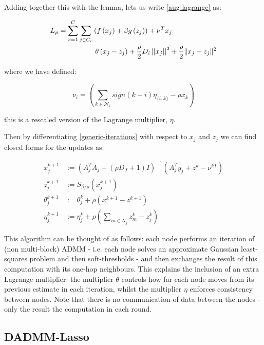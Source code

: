 Adding together this with the lemma, lets us write \eqref{aug-lagrange} as:

\begin{align}
L_\rho = \sum_{c=1}^C\sum_{j \in C_c} &\left( f\left(x_j\right) + \beta g\left(z_j\right)\right) + \nu^Tx_j \nonumber \\
& \text{        } \theta\left(x_j - z_j\right) + \frac{\rho}{2}D_i\left|\left|x_j\right|\right|^2 + \frac{\rho }{2}\|x_j-z_j\|^2
\label{generic-iterations}
\end{align}

where we have defined:

\begin{equation}
\nu_i = \left(\sum_{k \in \mathcal{N}_i} sign\left(k-i\right)\eta_{\{i,k\}} - \rho x_k \right)
\end{equation}

this is a rescaled version of the Lagrange multiplier, \(\eta\). 

Then by differentiating \eqref{generic-iterations} with respect to \(x_j\) and \(z_j\) we  can find closed forms for the updates as:

\begin{thm}
\begin{align}
x_j^{k+1} &:= \left(A_j^TA_j + (\rho D_J + 1) I\right)^{-1}\left(A_j^Ty_j +  z^k - \nu^{kT}\right)\\
z_j^{k+1} &:= S_{\beta/\rho}\left(x_j^{k+1} \right)
 \\
\theta_j^{k+1} &:= \theta_j^{k} + \rho \left(x^{k+1}-z^{k+1}\right) \\
\eta_j^{k+1} &:= \eta_j^k + \rho\left(\sum_{m \in N_j} z_m^k - z_j^k\right)
\label{dadmm_algo_lasso}
\end{align}
\end{thm}

This algorithm can be thought of as follows: each node performs an iteration of (non multi-block) ADMM - i.e. each node solves an approximate Gaussian least-squares problem and then soft-thresholds - and then exchanges the result of this computation with its one-hop neighbours. This explains the inclusion of an extra Lagrange multiplier: the multiplier \(\theta\) controls how far each node moves from its previous estimate in each iteration, whilst the multiplier \(\eta\) enforces consistency between nodes. Note that there is no communication of data between the nodes - only the result the computation in each round.

\subsection{DADMM-Lasso}

